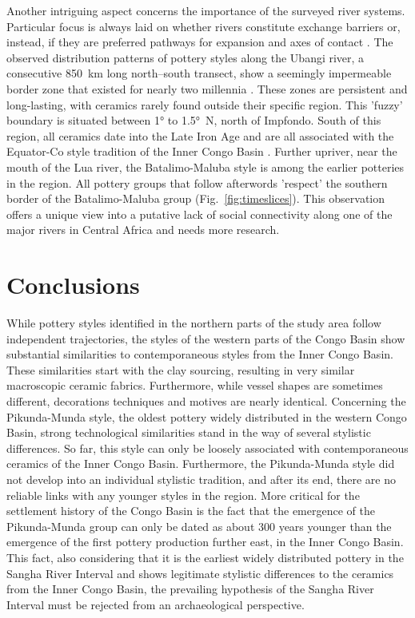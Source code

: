 \documentclass[smallextended,natbib]{svjour3}       %
\begin{document}
Another intriguing aspect concerns the importance of the surveyed river systems. Particular focus is always laid on whether rivers constitute exchange barriers or, instead, if they are preferred pathways for expansion and axes of contact \citep{Russell.2014}. The observed distribution patterns of pottery styles along the Ubangi river, a consecutive 850~km long north--south transect, show a seemingly impermeable border zone that existed for nearly two millennia \citep[183--185, 184 Tab.~17]{Seidensticker.2021e}. These zones are persistent and long-lasting, with ceramics rarely found outside their specific region. This 'fuzzy' boundary is situated between 1° to 1.5°~N, north of Impfondo. South of this region, all ceramics date into the Late Iron Age and are all associated with the Equator-Co style tradition of the Inner Congo Basin \citep{Wotzka.1995}. Further upriver, near the mouth of the Lua river, the Batalimo-Maluba style is among the earlier potteries in the region. All pottery groups that follow afterwords 'respect' the southern border of the Batalimo-Maluba group (Fig.~\ref{fig:timeslices}). This observation offers a unique view into a putative lack of social connectivity along one of the major rivers in Central Africa and needs more research.

\section*{Conclusions}

While pottery styles identified in the northern parts of the study area follow independent trajectories, the styles of the western parts of the Congo Basin show substantial similarities to contemporaneous styles from the Inner Congo Basin. These similarities start with the clay sourcing, resulting in very similar macroscopic ceramic fabrics. Furthermore, while vessel shapes are sometimes different, decorations techniques and motives are nearly identical. Concerning the Pikunda-Munda style, the oldest pottery widely distributed in the western Congo Basin, strong technological similarities stand in the way of several stylistic differences. So far, this style can only be loosely associated with contemporaneous ceramics of the Inner Congo Basin. Furthermore, the Pikunda-Munda style did not develop into an individual stylistic tradition, and after its end, there are no reliable links with any younger styles in the region. More critical for the settlement history of the Congo Basin is the fact that the emergence of the Pikunda-Munda group can only be dated as about 300 years younger than the emergence of the first pottery production further east, in the Inner Congo Basin. This fact, also considering that it is the earliest widely distributed pottery in the Sangha River Interval and shows legitimate stylistic differences to the ceramics from the Inner Congo Basin, the prevailing hypothesis of the Sangha River Interval must be rejected from an archaeological perspective.
\end{document}
